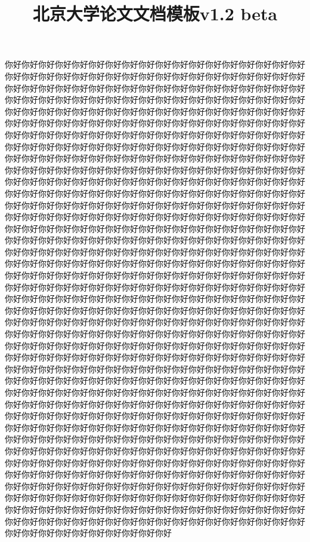 \documentclass[fntef,a4paper,fancyhdr,cs4size]{ctexbook}
\title{北京大学论文文档模板v1.2 beta}
\begin{document}
你好你好你好你好你好你好你好你好你好你好你好你好你好你好你好你好你好你好你好你好你好你好你好你好你好你好你好你好你好你好你好你好你好你好你好你好你好你好你好你好你好你好你好你好你好你好你好你好你好你好你好你好你好你好你好你好你好你好你好你好你好你好你好你好你好你好你好你好你好你好你好你好你好你好你好你好你好你好你好你好你好你好你好你好你好你好你好你好你好你好你好你好你好你好你好你好你好你好你好你好你好你好你好你好你好你好你好你好你好你好你好你好你好你好你好你好你好你好你好你好你好你好你好你好你好你好你好你好你好你好你好你好你好你好你好你好你好你好你好你好你好你好你好你好你好你好你好你好你好你好你好你好你好你好你好你好你好你好你好你好你好你好你好你好你好你好你好你好你好你好你好你好你好你好你好你好你好你好你好你好你好你好你好你好你好你好你好你好你好你好你好你好你好你好你好你好你好你好你好你好你好你好你好你好你好你好你好你好你好你好你好你好你好你好你好你好你好你好你好你好你好你好你好你好你好你好你好你好你好你好你好你好你好你好你好你好你好你好你好你好你好你好你好你好你好你好你好你好你好你好你好你好你好你好你好你好你好你好你好你好你好你好你好你好你好你好你好你好你好你好你好你好你好你好你好你好你好你好你好你好你好你好你好你好你好你好你好你好你好你好你好你好你好你好你好你好你好你好你好你好你好你好你好你好你好你好你好你好你好你好你好你好你好你好你好你好你好你好你好你好你好你好你好你好你好你好你好你好你好你好你好你好你好你好你好你好你好你好你好你好你好你好你好你好你好你好你好你好你好你好你好你好你好你好你好你好你好你好你好你好你好你好你好你好你好你好你好你好你好你好你好你好你好你好你好你好你好你好你好你好你好你好你好你好你好你好你好你好你好你好你好你好你好你好你好你好你好你好你好你好你好你好你好你好你好你好你好你好你好你好你好你好你好你好你好你好你好你好你好你好你好你好你好你好你好你好你好你好你好你好你好你好你好你好你好你好你好你好你好你好你好你好你好你好你好你好你好你好你好你好你好你好你好你好你好你好你好你好你好你好你好你好你好你好你好你好你好你好你好你好你好你好你好你好你好你好你好你好你好你好你好你好你好你好你好你好你好你好你好你好你好你好你好你好你好你好你好你好你好你好你好你好你好你好你好你好你好你好你好你好你好你好你好你好你好你好你好你好你好你好你好你好你好你好你好你好你好你好你好你好你好你好你好你好你好你好你好你好你好你好你好你好你好你好你好你好你好你好你好你好你好你好你好你好你好你好你好你好你好你好你好你好你好你好你好你好你好你好你好你好你好你好你好你好你好你好你好你好你好你好你好你好你好你好你好你好你好你好你好你好你好你好你好你好你好你好你好你好你好你好你好你好你好你好你好你好你好你好你好你好你好你好你好你好你好你好你好你好你好你好你好你好你好你好你好你好你好你好你好你好你好你好你好你好你好你好你好你好你好你好你好你好你好你好你好你好你好你好你好你好你好你好你好你好你好你好你好你好你好你好你好你好你好你好你好你好你好你好你好你好你好你好你好你好你好你好你好你好你好你好你好你好你好你好你好你好你好你好你好你好你好你好你好你好你好你好你好你好你好你好你好你好你好你好你好你好你好你好你好你好你好你好你好你好你好你好你好你好你好你好你好你好你好你好你好你好你好你好你好你好
\end{document}

